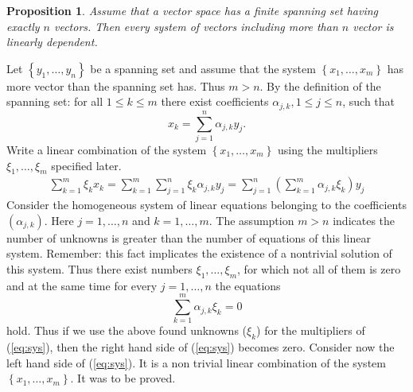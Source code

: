 \documentclass[9pt, a4paper, showtrims, article]{memoir}
\theoremstyle{plain}
\newtheorem{proposition}{Proposition}[chapter]
\begin{document}
\begin{proposition}
    Assume that a vector space has a finite spanning set having exactly $n$ vectors.
    Then every system of vectors including more than $n$ vector is linearly dependent.
\end{proposition}
    Let $\left\{ y_1,\ldots,y_n \right\}$ be a spanning set
    and assume that the system  $\left\{ x_1,\ldots,x_m \right\}$ has more vector than the spanning set has.
    Thus $m>n$.
    By the definition of the spanning set: for all $1\leq k\leq m$ there exist coefficients 
    $\alpha_{j,k}, 1\leq j\leq n$, such that
    \[
        x_k=\sum_{j=1}^n\alpha_{j,k}y_j.
    \]
    Write a linear combination of the system $\left\{ x_1,\dots,x_m \right\}$ using the multipliers $\xi_1,\ldots,\xi_m$ specified later.
    \begin{eqnarray}
        \sum_{k=1}^m\xi_kx_k=
        \sum_{k=1}^m\sum_{j=1}^n\xi_k\alpha_{j,k}y_j=
        \sum_{j=1}^n\left( \sum_{k=1}^m\alpha_{j,k}\xi_k \right)y_j
        \label{eq:sys}
    \end{eqnarray}
    Consider the homogeneous system of linear equations belonging to the coefficients $\left( \alpha_{j,k} \right)$.
    Here $j=1,\ldots,n$ and $k=1,\ldots,m$.
    The assumption $m>n$ indicates the number of unknowns is greater than the number of equations of this linear system.
    Remember: this fact implicates the existence of a nontrivial solution of this system.
    Thus there exist numbers $\xi_1,\ldots,\xi_m$, for which not all of them is zero
    and at the same time for every $j=1,\ldots,n$ the equations
    \[
        \sum_{k=1}^m\alpha_{j,k}\xi_k=0
    \]
    hold.
    Thus if we use the above found unknowns ($\xi_k$) for the multipliers of (\ref{eq:sys}), then the right hand side of (\ref{eq:sys}) becomes zero.
    Consider now the left hand side of (\ref{eq:sys}). 
    It is a non trivial linear combination of the system $\left\{ x_1,\ldots,x_m \right\}$.
    It was to be proved.
\end{document}
